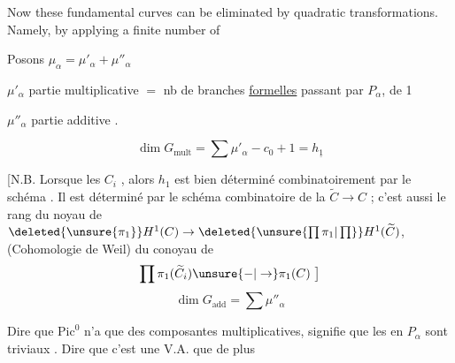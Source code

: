 Now these fundamental curves can be eliminated by quadratic transformations. Namely, by applying a finite number of

Posons $\mu_\alpha=\mu'_\alpha+\mu''_\alpha$

$\mu'_\alpha$ partie multiplicative $=$ nb de branches \uline{formelles} passant par $P_\alpha$,   de 1

$\mu''_\alpha$ partie additive .

\[
\dim G_{\mathrm{mult}}=\sum\mu'_\alpha-c_0+1=h_{\underline{1}}
\]

[N.B. Lorsque les $C_i$ , alors $h_1$  est bien déterminé  combinatoirement par le schéma  . Il est  déterminé par le schéma combinatoire de la  $\widetilde C\to C$ ; c'est aussi le rang du  noyau de $\deleted{\unsure{\pi_1}}H^1(C)\to\deleted{\unsure{\prod\pi_1|\prod}}H^1(\widetilde C)$, (Cohomologie de Weil)  du conoyau de
\[
\prod\pi_1(\widetilde C_i)\unsure{-|\to}\pi_1(C)\ \big]
\]
\[
\dim G_{\mathrm{add}}=\sum\mu''_\alpha
\]

Dire que $\mathrm{Pic}^0$ n'a que des composantes  multiplicatives, signifie que les  en $P_\alpha$ sont triviaux . Dire que c'est une V.A.   que  de plus

